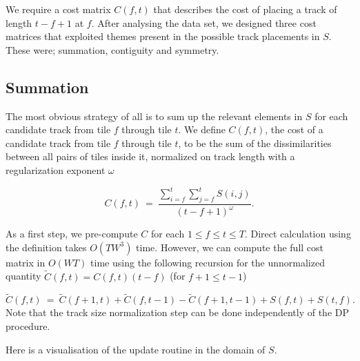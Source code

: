\documentclass[twocolumn]{article}
\begin{document}
We require a cost matrix $C(f,t)$ that describes the cost of placing a track of length $t-f+1$ at $f$. After analysing the data set, we designed three cost matrices that exploited themes present in the possible track placements in $S$. These were; summation, contiguity and symmetry.  

\subsection{Summation}

The most obvious strategy of all is to sum up the relevant elements in $S$ for each candidate track from tile $f$ through tile $t$. We define $C(f,t)$, the cost of a candidate track from tile $f$ through tile $t$, to be the sum of the dissimilarities between all pairs of tiles inside it, normalized on track length with a regularization exponent $\omega$

\begin{dmath*}
C(f,t) ~=~ \frac{ \sum_{i=f}^{t} \sum_{j=f}^{t} S(i,j) }{ (t-f+1)^\omega }.
\end{dmath*}

As a first step, we pre-compute $C$ for each $1 \le f \le t \le T$. Direct calculation using the definition takes $O(T W^3)$ time. However, we can compute the full cost matrix in $O(W T)$ time using the following recursion for the unnormalized quantity $\tilde
C(f,t) = C(f,t)(t-f)$ (for $f+1 \le t-1$)

\begin{dmath*}
\tilde C(f,t) ~=~ \tilde C(f+1,t) + \tilde C(f,t-1) - \tilde C(f+1,t-1) + S(f,t) + S(t,f)
.
\end{dmath*}
 Note that the track size normalization step can be done independently of the DP procedure. 

Here is a visualisation of the update routine in the domain of $S$.

    \begin{center}
    \end{center}
\end{document}
